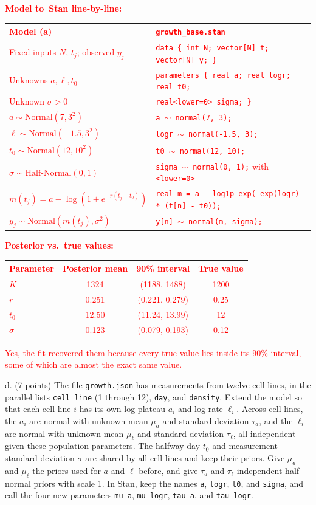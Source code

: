 \documentclass[11pt]{article}
\begin{document}
\textcolor{red}{
\textbf{Model to\ Stan line-by-line:}
\begin{center}
\begin{tabular}{ll}
Model (a) & {\tt growth\_base.stan} \\ \hline
Fixed inputs $N$, $t_j$; observed $y_j$ & {\tt data \{ int N; vector[N] t; vector[N] y; \}} \\
Unknowns $a,\ell,t_0$ & {\tt parameters \{ real a; real logr; real t0;} \\
Unknown $\sigma>0$ & {\tt real<lower=0> sigma; \}} \\
$a\sim \text{Normal}(7,3^2)$ & {\tt a $\sim$ normal(7, 3);} \\
$\ell\sim \text{Normal}(-1.5,3^2)$ & {\tt logr $\sim$ normal(-1.5, 3);} \\
$t_0\sim \text{Normal}(12,10^2)$ & {\tt t0 $\sim$ normal(12, 10);} \\
$\sigma\sim \text{Half-Normal}(0,1)$ & {\tt sigma $\sim$ normal(0, 1);} with {\tt <lower=0>} \\
$m(t_j)=a-\log(1+e^{-r(t_j-t_0)})$ & {\tt real m = a - log1p\_exp(-exp(logr) * (t[n] - t0));} \\
$y_j\sim \text{Normal}(m(t_j),\sigma^2)$ & {\tt y[n] $\sim$ normal(m, sigma);}
\end{tabular}
\end{center}
\textbf{Posterior vs.\ true values:}
\begin{center}
\begin{tabular}{lccc}
Parameter & Posterior mean & 90\% interval & True value  \\ \hline
$K$ & 1324 & (1188, 1488) & 1200\\
$r$ & 0.251 & (0.221, 0.279) & 0.25\\
$t_0$ & 12.50 & (11.24, 13.99) & 12\\
$\sigma$ & 0.123 & (0.079, 0.193) & 0.12
\end{tabular}
\end{center}
Yes, the fit recovered them because every true value lies inside its 90\% interval, some of which are almost the exact same value.
}

d. (7 points) The file {\tt growth.json} has measurements from twelve cell lines, in the parallel
lists {\tt cell\_line} (1 through 12), {\tt day}, and {\tt density}. Extend the model so that each
cell line $i$ has its own log plateau $a_i$ and log rate $\ell_i$. Across cell lines, the $a_i$
are normal with unknown mean $\mu_a$ and standard deviation $\tau_a$, and the $\ell_i$ are normal
with unknown mean $\mu_\ell$ and standard deviation $\tau_\ell$, all independent given these
population parameters. The halfway day $t_0$ and measurement standard deviation $\sigma$ are
shared by all cell lines and keep their priors. Give $\mu_a$ and $\mu_\ell$ the priors used for $a$
and $\ell$ before, and give $\tau_a$ and $\tau_\ell$ independent half-normal priors with scale 1. In Stan, keep the names {\tt a}, {\tt logr}, {\tt t0}, and {\tt sigma}, and call the
four new parameters {\tt mu\_a}, {\tt mu\_logr}, {\tt tau\_a}, and {\tt tau\_logr}.
\end{document}
